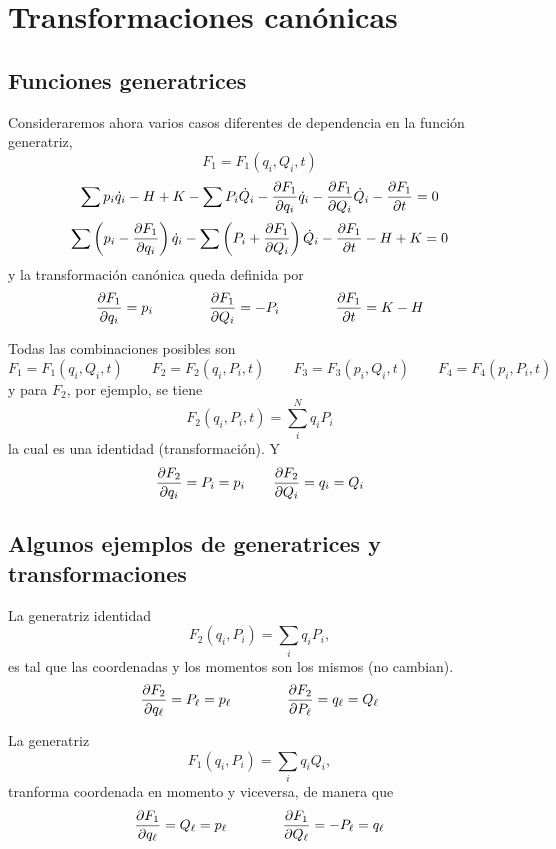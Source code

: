 \documentclass[10pt,oneside]{CBFT_book}
\begin{document}
\chapter{Transformaciones canónicas}

\section{Funciones generatrices}

Consideraremos ahora varios casos diferentes de dependencia en la función generatriz,
\[
	F_1 = F_1(q_i,Q_i,t)
\]
\[
	\sum p_i \dot{q}_i - H + K - \sum P_i \dot{Q}_i - \dpar{F_1}{q_i} \dot{q}_i - \dpar{F_1}{Q_i} \dot{Q}_i -
	\dpar{F_1}{t} = 0 
\]
\[
	\sum \left( p_i - \dpar{F_1}{q_i} \right) \dot{q}_i  - \sum \left( P_i + \dpar{F_1}{Q_i} \right) \dot{Q}_i -
	\dpar{F_1}{t} - H + K = 0 
\]
y la transformación canónica queda definida por 
\[
	\dpar{F_1}{q_i} = p_i \qquad \qquad \dpar{F_1}{Q_i} = - P_i \qquad \qquad \dpar{F_1}{t} = K-H
\]

Todas las combinaciones posibles son 
\[
	F_1 = F_1(q_i,Q_i,t) \qquad 
	F_2 = F_2(q_i,P_i,t) \qquad 
	F_3 = F_3(p_i,Q_i,t) \qquad 
	F_4 = F_4(p_i,P_i,t)
\]
y para $F_2$, por ejemplo, se tiene 
\[
	F_2(q_i,P_i,t) = \sum_i^N q_i P_i
\]
la cual es una identidad (transformación). Y
\[
	\dpar{F_2}{q_i} = P_i = p_i \qquad \dpar{F_2}{Q_i} = q_i = Q_i
\]

\section{Algunos ejemplos de generatrices y transformaciones}

La generatriz identidad
\[
	F_2(q_i,P_i) = \sum_i q_i P_i,
\]
es tal que las coordenadas y los momentos son los mismos (no cambian).
\[
	\dpar{F_2}{q_\ell} = P_\ell = p_\ell \qquad \qquad \dpar{F_2}{P_\ell} = q_\ell = Q_\ell
\]

La generatriz
\[
	F_1(q_i,P_i) = \sum_i q_i Q_i,
\]
tranforma coordenada en momento y viceversa, de manera que 
\[
	\dpar{F_1}{q_\ell} = Q_\ell = p_\ell \qquad \qquad \dpar{F_1}{Q_\ell} = -P_\ell = q_\ell
\]
\end{document}
